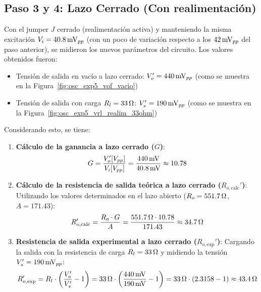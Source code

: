 \begin{table}[!ht]
    \centering
    \caption{Mediciones y cálculos en condición de lazo abierto.}
    \label{tab:exp5_lazo_abierto}
\end{table}

\subsection{Paso 3 y 4: Lazo Cerrado (Con realimentación)}
Con el jumper $J$ cerrado (realimentación activa) y manteniendo la misma
excitación $V_i = 40.8\mV_{pp}$ (con un poco de variación respecto a los
$42\mV_{pp}$ del paso anterior), se midieron los nuevos parámetros del circuito.
Los valores obtenidos fueron:

\begin{itemize}
    \item Tensión de salida en vacío a lazo cerrado: $V_o' = 440\mV_{pp}$ (como se muestra en la Figura~\ref{fig:osc_exp5_vof_vacio})
    \item Tensión de salida con carga $R_l = 33\ohm$: $V_s' = 190\mV_{pp}$ (como se muestra en la Figura~\ref{fig:osc_exp5_vrl_realim_33ohm})
\end{itemize}

Considerando esto, se tiene:
\begin{enumerate}
    \item \textbf{Cálculo de la ganancia a lazo cerrado ($G$)}:
          \begin{equation}
              G = \frac{V_o' [V_{pp}]}{V_i [V_{pp}]} = \frac{440\mV}{40.8\mV} \approx 10.78
          \end{equation}
    \item \textbf{Cálculo de la resistencia de salida teórica a lazo cerrado ($R_{o,\text{calc}}'$)}:
          Utilizando los valores determinados en el lazo abierto ($R_o = 551.7\ohm$, $A = 171.43$):
          \begin{equation}
              R_{o,\text{calc}}' = \frac{R_o \cdot G}{A} = \frac{551.7\ohm \cdot 10.78}{171.43} \approx 34.7\ohm
          \end{equation}
    \item \textbf{Resistencia de salida experimental a lazo cerrado ($R_{o,\text{exp}}'$)}:
          Cargando la salida con la resistencia de carga $R_l = 33\ohm$ y midiendo la tensión $V_s' = 190\mV_{pp}$:
          \begin{equation}
              R_{o,\text{exp}}' = R_l \cdot \left( \frac{V_o'}{V_s'} - 1 \right) = 33\ohm \cdot \left( \frac{440\mV}{190\mV} - 1 \right) = 33\ohm \cdot \left( 2.3158 - 1 \right) \approx 43.4\ohm
          \end{equation}
\end{enumerate}

